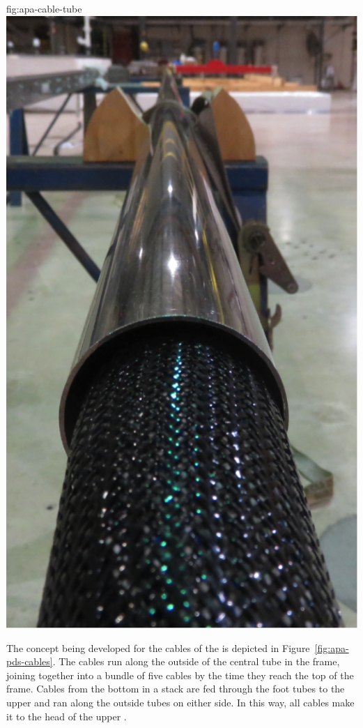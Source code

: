 \begin{dunefigure}{fig:apa-cable-tube}
\includegraphics[height=0.3\textheight]{graphics/sp-apa-cable-tube-photo.png}
\end{dunefigure}

The concept being developed for the cables of the   is depicted in Figure~\ref{fig:apa-pds-cables}.  The cables run along the outside of the central tube in the  frame, joining together into a bundle of five cables by the time they reach the top of the frame.  Cables from the bottom  in a stack are fed through the foot tubes to the upper  and ran along the outside tubes on either side.  In this way, all  cables make it to the head of the upper .  

